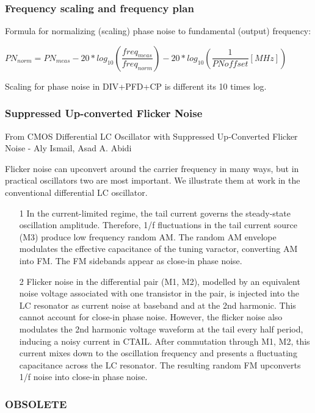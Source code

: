 \subsubsection*{Frequency scaling and frequency plan}

Formula for normalizing (scaling) phase noise to fundamental (output) frequency:

$PN_{norm}=PN_{meas}-20*log_{10}(\dfrac{freq_{meas}}{freq_{norm}})-20*log_{10}(\dfrac{1}{PNoffset}[MHz])$

Scaling for phase noise in DIV+PFD+CP is different its 10 times log.

\subsubsection*{Suppressed Up-converted Flicker Noise}

From CMOS Differential LC Oscillator with Suppressed Up-Converted Flicker Noise - Aly Ismail, Asad A. Abidi

\begin{info}
	Flicker noise can upconvert around the carrier frequency in many ways, but in practical oscillators two are most important. We illustrate them at work in the conventional differential LC oscillator.
	\begin{itemize}
		\item [1] In the current-limited regime, the tail current governs the steady-state oscillation amplitude. Therefore, 1/f fluctuations in the tail current source (M3) produce low frequency random AM. The random AM envelope modulates the effective capacitance of the tuning varactor, converting AM into FM. The FM sidebands appear as close-in phase noise. 
		\item [2] Flicker noise in the differential pair (M1, M2), modelled by an equivalent noise voltage associated with one transistor in the pair, is injected into the LC resonator as current noise at baseband and at the 2nd harmonic. This cannot account for close-in phase noise. However, the flicker noise also modulates the 2nd harmonic voltage waveform at the tail every half period, inducing a noisy current in CTAIL. After commutation through M1, M2, this current mixes down to the oscillation frequency and presents a fluctuating capacitance across the LC resonator. The resulting random FM upconverts 1/f noise into close-in phase noise.
	\end{itemize}
\end{info}

\subsubsection*{OBSOLETE}

